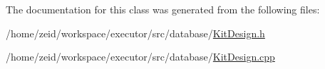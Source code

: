 \label{class_kit_design_ab4d97388a048a5dd4bcbf0a91ac98b93}


The documentation for this class was generated from the following files:\begin{DoxyCompactItemize}
\item 
/home/zeid/workspace/executor/src/database/\hyperlink{_kit_design_8h}{KitDesign.h}\item 
/home/zeid/workspace/executor/src/database/\hyperlink{_kit_design_8cpp}{KitDesign.cpp}\end{DoxyCompactItemize}
